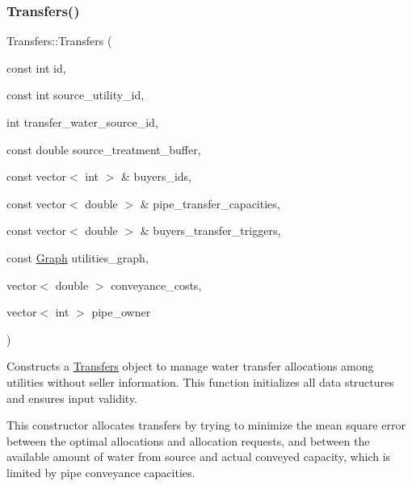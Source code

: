 \subsubsection{\texorpdfstring{Transfers()}{Transfers()}\hspace{0.1cm}{\footnotesize\ttfamily [1/3]}}
{\footnotesize\ttfamily Transfers\+::\+Transfers (\begin{DoxyParamCaption}\item[{const int}]{id,  }\item[{const int}]{source\+\_\+utility\+\_\+id,  }\item[{int}]{transfer\+\_\+water\+\_\+source\+\_\+id,  }\item[{const double}]{source\+\_\+treatment\+\_\+buffer,  }\item[{const vector$<$ int $>$ \&}]{buyers\+\_\+ids,  }\item[{const vector$<$ double $>$ \&}]{pipe\+\_\+transfer\+\_\+capacities,  }\item[{const vector$<$ double $>$ \&}]{buyers\+\_\+transfer\+\_\+triggers,  }\item[{const \mbox{\hyperlink{classGraph}{Graph}}}]{utilities\+\_\+graph,  }\item[{vector$<$ double $>$}]{conveyance\+\_\+costs,  }\item[{vector$<$ int $>$}]{pipe\+\_\+owner }\end{DoxyParamCaption})}



Constructs a \mbox{\hyperlink{classTransfers}{Transfers}} object to manage water transfer allocations among utilities without seller information. This function initializes all data structures and ensures input validity. 

This constructor allocates transfers by trying to minimize the mean square error between the optimal allocations and allocation requests, and between the available amount of water from source and actual conveyed capacity, which is limited by pipe conveyance capacities.


